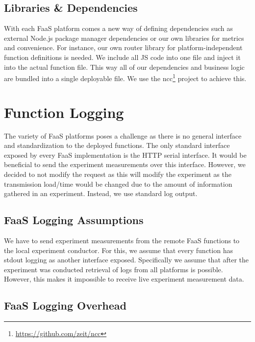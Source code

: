 \documentclass[../main.tex]{subfiles}
\begin{document}
\subsection{Libraries \& Dependencies}%
\label{sub:designLibsDeps}

With each FaaS platform comes a new way of defining dependencies such as external Node.js 
package manager dependencies or our own libraries for metrics and convenience.
For instance, our own router library for platform-independent function definitions is needed.
We include all JS code into one file and inject it into the actual function file. 
This way all of our dependencies and business logic are bundled into a single deployable file. 
We use the ncc\footnote{\url{https://github.com/zeit/ncc}} project to achieve this.

\section{Function Logging}%
\label{sec:functionLogging}

The variety of FaaS platforms poses a challenge as there is no general interface and standardization to the deployed functions. 
The only standard interface exposed by every FaaS implementation is the HTTP serial interface. 
It would be beneficial to send the experiment measurements over this interface. 
However, we decided to not modify the request as this will modify the experiment as the transmission load/time 
would be changed due to the amount of information gathered in an experiment.
Instead, we use standard log output.

\subsection{FaaS Logging Assumptions}%
\label{sub:designLoggingAssumptions}

We have to send experiment measurements from the remote FaaS functions to the local experiment conductor. 
For this, we assume that every function has stdout logging as another interface exposed. 
Specifically we assume that after the experiment was conducted retrieval of logs from all platforms is possible. 
However, this makes it impossible to receive live experiment measurement data.

\subsection{FaaS Logging Overhead}%
\label{sub:designLoggingOverhead}
\end{document}
